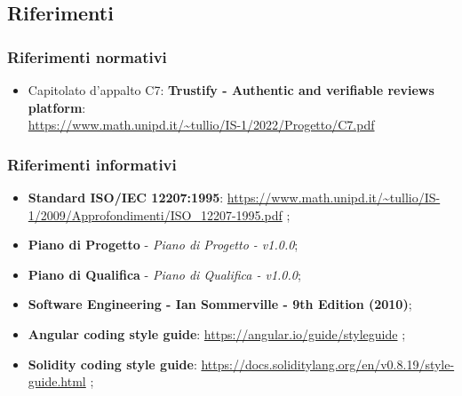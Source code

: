 \subsection{Riferimenti}
\subsubsection{Riferimenti normativi}
\begin{itemize}
    \item Capitolato d'appalto C7: \textbf{Trustify - Authentic and verifiable reviews platform}: \\
          \url{https://www.math.unipd.it/~tullio/IS-1/2022/Progetto/C7.pdf}
          \hfill{}
\end{itemize}
\subsubsection{Riferimenti informativi}
\begin{itemize}
    \item \textbf{Standard ISO/IEC 12207:1995}: \url{https://www.math.unipd.it/~tullio/IS-1/2009/Approfondimenti/ISO_12207-1995.pdf} \hfill{};
    \item \textbf{Piano di Progetto} - \textit{Piano di Progetto - v1.0.0};
    \item \textbf{Piano di Qualifica} - \textit{Piano di Qualifica - v1.0.0};
    \item \textbf{Software Engineering - Ian Sommerville - 9th Edition (2010)};
    \item \textbf{Angular coding style guide}: \url{https://angular.io/guide/styleguide} \hfill{};
    \item \textbf{Solidity coding style guide}: \url{https://docs.soliditylang.org/en/v0.8.19/style-guide.html} \hfill{};
\end{itemize}

